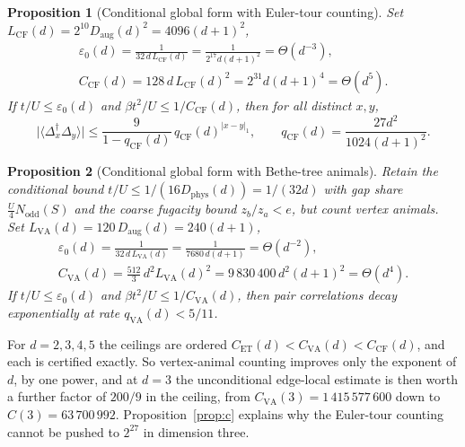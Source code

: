 \documentclass[11pt]{article}
\theoremstyle{plain}
\newtheorem{proposition}{Proposition}
\theoremstyle{definition}
\newcommand{\Nodd}{N_{\mathrm{odd}}}
\newcommand{\Dphys}{D_{\mathrm{phys}}}
\newcommand{\Daug}{D_{\mathrm{aug}}}
\newcommand{\Dop}{\Delta}
\begin{document}
\begin{proposition}[Conditional global form with Euler-tour counting]\label{prop:b1}
Set $L_{\mathrm{CF}}(d)=2^{10}\Daug(d)^2=4096(d+1)^2$,
\begin{equation}\label{eq:b1constants}
\begin{gathered}
 \varepsilon_0(d)=\frac{1}{32\,d\,L_{\mathrm{CF}}(d)}=\frac{1}{2^{17}d(d+1)^2}
 =\Theta(d^{-3}),\\
 C_{\mathrm{CF}}(d)=128\,d\,L_{\mathrm{CF}}(d)^2=2^{31}d(d+1)^4=\Theta(d^5).
\end{gathered}
\end{equation}
If $t/U\le\varepsilon_0(d)$ and $\beta t^2/U\le1/C_{\mathrm{CF}}(d)$, then for all
distinct $x,y$,
\begin{equation}\label{eq:b1bound}
 \bigl|\langle\Dop_x^\dagger\Dop_y\rangle\bigr|
 \le\frac{9}{1-q_{\mathrm{CF}}(d)}\,q_{\mathrm{CF}}(d)^{|x-y|_1},
 \qquad q_{\mathrm{CF}}(d)=\frac{27d^2}{1024(d+1)^2}.
\end{equation}
\end{proposition}

\begin{proposition}[Conditional global form with Bethe-tree animals]\label{prop:b2}
Retain the conditional bound $t/U\le1/(16\Dphys(d))=1/(32d)$ with gap share
$\frac U4\Nodd(S)$ and the coarse fugacity bound $z_b/z_a<e$, but count vertex
animals. Set $L_{\mathrm{VA}}(d)=120\,\Daug(d)=240(d+1)$,
\begin{equation}\label{eq:b2constants}
\begin{gathered}
 \varepsilon_0(d)=\frac{1}{32\,d\,L_{\mathrm{VA}}(d)}=\frac{1}{7680\,d(d+1)}
 =\Theta(d^{-2}),\\
 C_{\mathrm{VA}}(d)=\frac{512}{3}\,d^2L_{\mathrm{VA}}(d)^2
 =9\,830\,400\,d^2(d+1)^2=\Theta(d^4).
\end{gathered}
\end{equation}
If $t/U\le\varepsilon_0(d)$ and $\beta t^2/U\le1/C_{\mathrm{VA}}(d)$, then pair
correlations decay exponentially at rate $q_{\mathrm{VA}}(d)<5/11$.
\end{proposition}

For $d=2,3,4,5$ the ceilings are ordered
$C_{\mathrm{ET}}(d)<C_{\mathrm{VA}}(d)<C_{\mathrm{CF}}(d)$, and each is certified
exactly. So vertex-animal counting improves only the exponent of $d$, by one power,
and at $d=3$ the unconditional edge-local estimate is then worth a further factor of
$200/9$ in the ceiling, from $C_{\mathrm{VA}}(3)=1\,415\,577\,600$ down to
$C(3)=63\,700\,992$.
Proposition~\ref{prop:c} explains why the Euler-tour counting cannot be pushed to
$2^{27}$ in dimension three.
\end{document}
